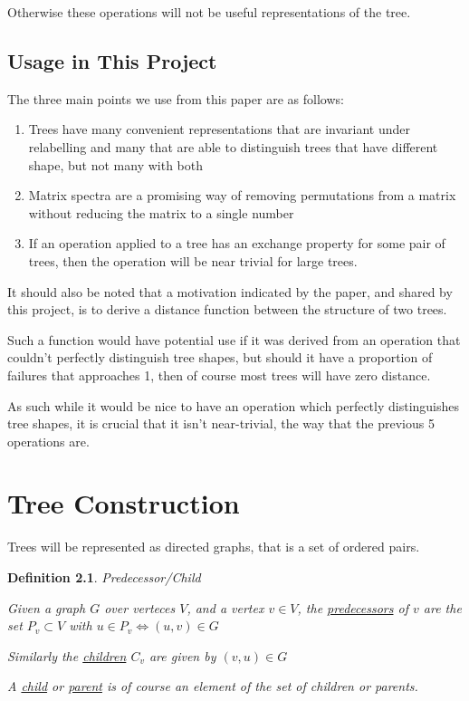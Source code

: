 \documentclass[10pt,a4paper]{report}
\newtheorem{definition}{Definition}
\begin{document}
Otherwise these operations will not be useful representations of the tree.

\section{Usage in This Project}

The three main points we use from this paper are as follows:
\begin{enumerate}
	\item Trees have many convenient representations that are invariant under
		relabelling and many that are able to distinguish trees that have
		different shape, but not many with both
	\item Matrix spectra are a promising way of removing permutations from a
		matrix without reducing the matrix to a single number
	\item If an operation applied to a tree has an exchange property for some
		pair of trees, then the operation will be near trivial for large trees.
\end{enumerate}

It should also be noted that a motivation indicated by the paper, and shared by
this project, is to derive a distance function between the structure of two
trees.

Such a function would have potential use if it was derived from an operation
that couldn't perfectly distinguish tree shapes, but should it have a
proportion of failures that approaches 1, then of course most trees will have
zero distance.

As such while it would be nice to have an operation which perfectly
distinguishes tree shapes, it is crucial that it isn't near-trivial, the way
that the previous 5 operations are.

\chapter{Tree Construction}

Trees will be represented as directed graphs, that is a set of ordered pairs.

\begin{definition} Predecessor/Child

	Given a graph $G$ over verteces $V$, and a vertex $v \in V$, the
	\underline{predecessors} of $v$ are the set $P_v \subset V$ with $u \in P_v
	\Leftrightarrow (u, v) \in G$

	Similarly the \underline{children} $C_v$ are given by $(v, u) \in G$

	A \underline{child} or \underline{parent} is of course an element of the
	set of children or parents.
\end{definition}
\end{document}
